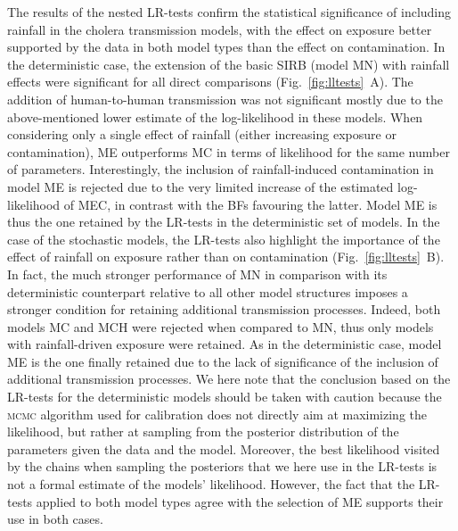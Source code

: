 The results of the nested LR-tests confirm the statistical significance of including rainfall in the cholera transmission models, with the effect on exposure better supported by the data in both model types than the effect on contamination. In the deterministic case, the extension of the basic SIRB (model \textsc{MN}) with rainfall effects were significant for all direct comparisons (Fig.~\ref{fig:lltests}~A). The addition of human-to-human transmission was not significant mostly due to the above-mentioned lower estimate of the log-likelihood in these models. When considering only a single effect of rainfall (either increasing exposure or contamination), \textsc{ME} outperforms \textsc{MC} in terms of likelihood for the same number of parameters. Interestingly, the inclusion of rainfall-induced contamination in model \textsc{ME} is rejected due to the very limited increase of the estimated log-likelihood of \textsc{MEC}, in contrast with the BFs favouring the latter. Model \textsc{ME} is thus the one retained by the LR-tests in the deterministic set of models. In the case of the stochastic models, the LR-tests also highlight the importance of the effect of rainfall on exposure rather than on contamination (Fig.~\ref{fig:lltests}~B). In fact, the much stronger performance of \textsc{MN} in comparison with its deterministic counterpart relative to all other model structures imposes a stronger condition for retaining additional transmission processes. Indeed, both models \textsc{MC} and \textsc{MCH} were rejected when compared to \textsc{MN}, thus only models with rainfall-driven exposure were retained. As in the deterministic case, model \textsc{ME} is the one finally retained due to the lack of significance of the inclusion of additional transmission processes. We here note that the conclusion based on the LR-tests for the deterministic models should be taken with caution because the \textsc{mcmc} algorithm used for calibration does not directly aim at maximizing the likelihood, but rather at sampling from the posterior distribution of the parameters given the data and the model. Moreover, the best likelihood visited by the chains when sampling the posteriors that we here use in the LR-tests is not a formal estimate of the models' likelihood. However, the fact that the LR-tests applied to both model types agree with the selection of \textsc{ME} supports their use in both cases.

